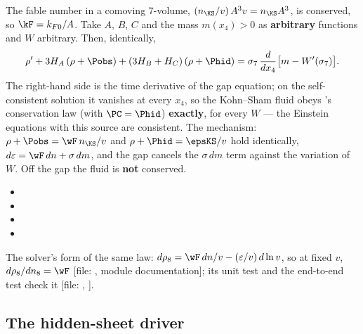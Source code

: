 The fable number in a comoving 7-volume, $(n_{\KS}/v)\,A^3v=n_{\KS}A^3$, is conserved, so $\kF=k_{F0}/A$.
Take $A$, $B$, $C$ and the mass $m(x_4)>0$ as \textbf{arbitrary} functions and $W$ arbitrary. Then,
identically,
\[
  \rho'+3H_A\,(\rho+\Pobs)+(3H_B+H_C)\,(\rho+\Phid)=\sigma_7\,\frac{d}{dx_4}\bigl[m-W'(\sigma_7)\bigr] .
\]
The right-hand side is the time derivative of the gap equation; on the self-consistent solution it
vanishes at every $x_4$, so the Kohn--Sham fluid obeys 's conservation law (with
$\PC=\Phid$) \textbf{exactly}, for every $W$ --- the Einstein equations with this source are consistent.
The mechanism: $\rho+\Pobs=\wF\,n_{\KS}/v$ and $\rho+\Phid=\epsKS/v$ hold identically,
$d\varepsilon=\wF\,dn+\sigma\,dm$, and the gap cancels the $\sigma\,dm$ term against the variation of $W$.
Off the gap the fluid is \textbf{not} conserved. 
\begin{itemize}
  \item {}
  \item {}
  \item {}
  \item {}
\end{itemize}

The solver's form of the same law: $d\rho_8=\wF\,dn/v-(\varepsilon/v)\,d\ln v$, so at fixed $v$,
$d\rho_8/dn_8=\wF$ [file: , module documentation]; its unit test
 and the end-to-end test
 check it [file: ,
].

\subsection{The hidden-sheet driver}
\label{sec:7.6}

